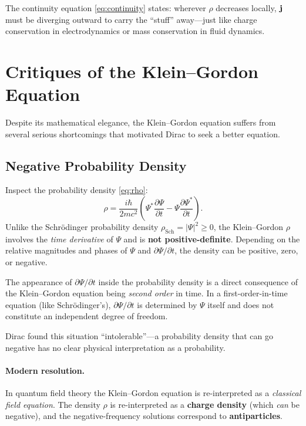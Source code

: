 \documentclass[12pt, a4paper]{article}
\theoremstyle{definition}
\begin{document}
The continuity equation \eqref{eq:continuity} states: wherever $\rho$
decreases locally, $\vb{j}$ must be diverging outward to carry the ``stuff''
away---just like charge conservation in electrodynamics or mass conservation
in fluid dynamics.

\section{Critiques of the Klein--Gordon Equation}
\label{sec:critiques}

Despite its mathematical elegance, the Klein--Gordon equation suffers from
several serious shortcomings that motivated Dirac to seek a better equation.

\subsection{Negative Probability Density}

Inspect the probability density \eqref{eq:rho}:
\begin{equation}
    \rho = \frac{i\hbar}{2mc^{2}}
      \left(
        \Psi^{*}\frac{\partial\Psi}{\partial t}
        - \Psi\frac{\partial\Psi^{*}}{\partial t}
      \right).
\end{equation}
Unlike the Schr\"{o}dinger probability density $\rho_{\text{Sch}} =
|\Psi|^{2} \geq 0$, the Klein--Gordon $\rho$ involves the \emph{time
derivative} of $\Psi$ and is \textbf{not positive-definite}.  Depending on
the relative magnitudes and phases of $\Psi$ and $\partial\Psi/\partial t$,
the density can be positive, zero, or negative.

\begin{warning}
The appearance of $\partial\Psi/\partial t$ inside the probability density
is a direct consequence of the Klein--Gordon equation being \emph{second
order} in time.  In a first-order-in-time equation (like Schr\"{o}dinger's),
$\partial\Psi/\partial t$ is determined by $\Psi$ itself and does not
constitute an independent degree of freedom.
\end{warning}

Dirac found this situation ``intolerable''---a probability density that can
go negative has no clear physical interpretation as a probability.

\paragraph{Modern resolution.}
In quantum field theory the Klein--Gordon equation is re-interpreted as a
\emph{classical field equation}.  The density $\rho$ is re-interpreted as a
\textbf{charge density} (which \emph{can} be negative), and the negative-frequency solutions correspond to \textbf{antiparticles}.
\end{document}
